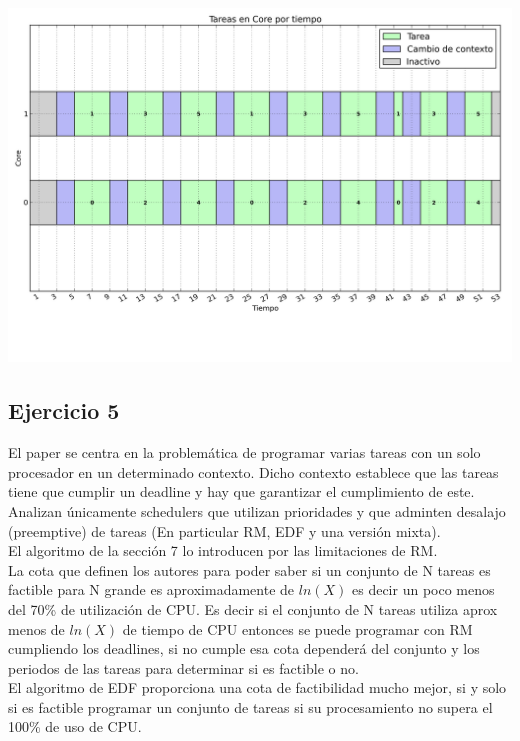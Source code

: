 \begin{center}
\includegraphics[scale=0.4]{graficos/out_cores_timeline1.png}
\end{center}


\subsection{Ejercicio 5}

El paper\cite{liu1973scheduling} se centra en la problemática de programar varias tareas con un solo procesador en un determinado contexto.
Dicho contexto establece que las tareas tiene que cumplir un deadline y hay que garantizar el cumplimiento de este. \\


Analizan únicamente schedulers que utilizan prioridades y que adminten desalajo (preemptive) de tareas (En particular RM, EDF y una versión mixta).\\


El algoritmo de la sección 7 lo introducen por las limitaciones de RM.\\


La cota que definen los autores para poder saber si un conjunto de N tareas es factible para N grande es aproximadamente de $ln(X)$ es decir un poco menos del 70\% de utilización de CPU.
Es decir si el conjunto de N tareas utiliza aprox menos de $ln(X)$ de tiempo de CPU entonces se puede programar con RM cumpliendo los deadlines, si no cumple esa cota dependerá del conjunto y los periodos de las tareas para determinar si es factible o no. \\


El algoritmo de EDF proporciona una cota de factibilidad mucho mejor, si y solo si es factible programar un conjunto de tareas si su procesamiento no supera el 100\% de uso de CPU.\\


